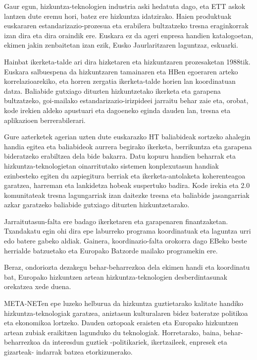 \begin{multicols}{2}
    Gaur egun, hizkuntza-teknologien industria aski hedatuta dago, eta ETT askok lantzen dute eremu hori, batez ere hizkuntza idatzirako. Haien produktuak euskararen estandarizazio-prozesua eta erabilera bultzatzeko tresna eraginkorrak izan dira eta dira oraindik ere. Euskara ez da ageri enpresa handien katalogoetan, ekimen jakin zenbaitetan izan ezik, Eusko Jaurlaritzaren laguntzaz, eskuarki.

    Hainbat ikerketa-talde ari dira hizketaren eta hizkuntzaren prozesaketan 1988tik. Euskara salbuespena da hizkuntzaren tamainaren eta HBen egoeraren arteko korrelazioarekiko, eta horren zergatia ikerketa-talde horien lan koordinatuan datza. Baliabide gutxiago dituzten hizkuntzetako ikerketa eta garapena bultzatzeko, goi-mailako estandarizazio-irizpideei jarraitu behar zaie eta, orobat, kode irekien aldeko apustuari eta dagoeneko eginda dauden lan, tresna eta aplikazioen berrerabilerari.

    Gure azterketek agerian uzten dute euskarazko HT baliabideak sortzeko ahalegin handia egitea eta baliabideok aurrera begirako ikerketa, berrikuntza eta garapena bideratzeko erabiltzea dela bide bakarra. Datu kopuru handien beharrak eta hizkuntza-teknologietan oinarritutako sistemen konplexutasun handiak ezinbesteko egiten du azpiegitura berriak eta ikerketa-antolaketa koherenteagoa garatzea, harreman eta lankidetza hobeak suspertuko badira. Kode irekia eta 2.0 komunitateak tresna lagungarriak izan daitezke tresna eta baliabide jasangarriak azkar garatzeko baliabide gutxiago dituzten hizkuntzetarako.

    Jarraitutasun-falta ere badago ikerketaren eta garapenaren finantzaketan. Txandakatu egin ohi dira epe laburreko programa koordinatuak eta laguntza urri edo batere gabeko aldiak. Gainera, koordinazio-falta orokorra dago EBeko beste herrialde batzuetako eta Europako Batzorde mailako programekin ere.

    Beraz, ondoriozta dezakegu behar-beharrezkoa dela ekimen handi eta koordinatu bat, Europako hizkuntzen artean hizkuntza-teknologien desberdintasunak orekatzea xede duena.

    META-NETen epe luzeko helburua da hizkuntza guztietarako kalitate handiko hizkuntza-teknologiak garatzea, aniztasun kulturalaren bidez bateratze politikoa eta ekonomikoa lortzeko. Dauden oztopoak eraisten eta Europako hizkuntzen artean zubiak eraikitzen lagunduko du teknologiak. Horretarako, baina, behar-beharrezkoa da interesdun guztiek -politikariek, ikertzaileek, enpresek eta gizarteak- indarrak batzea etorkizunerako.



\end{multicols}
